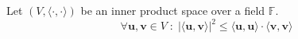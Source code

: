\documentclass[aspectratio=169]{beamer}
\newcommand{\vc}[1]{\mathbf{#1}}
\begin{document}
\begin{wallpaperframe}
Let \(\left(V,\langle\cdot,\cdot\rangle\right)\) be an inner product space over a field \(\mathbb{F}\).
\[
\forall \vc{u},\vc{v} \in V\;:\; \left|\langle\vc{u},\vc{v}\rangle\right|^2 \leq \langle\vc{u},\vc{u}\rangle \cdot \langle\vc{v},\vc{v}\rangle
\]
\end{wallpaperframe}
\end{document}
